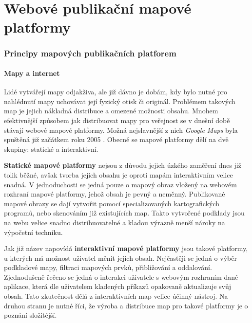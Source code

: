 \newpage

\part{Webové publikační mapové platformy}
\newpage
\section{Principy mapových publikačních platforem}

\subsection{Mapy a internet}

Lidé vytvářejí mapy odjakživa, ale již dávno je dobám, kdy bylo nutné
pro nahlédnutí mapy uchovávat její fyzický otisk či originál. Problémem
takových map je jejich nákladná distribuce a omezené možnosti
obsahu. Mnohem efektivnější způsobem jak distribuovat mapy pro
veřejnost se v dnešní době stávají webové mapové platformy. Možná
nejslavnější z nich \textit{Google Maps} byla spuštěná již začátkem
roku 2005 \cite{google_history}.  Obecně se mapové platformy dělí na
dvě skupiny: statické a interaktivní.

\textbf{Statické mapové platformy} nejsou z důvodu jejich úzkého
zaměření dnes již tolik běžné, avšak tvorba jejich obsahu je oproti
mapám interaktivním velice snadná. V jednoduchosti se jedná pouze o mapový obraz vložený na webovém rozhraní mapové platformy, jehož obsah je pevný a neměnný. Publikované mapové obrazy se dají vytvořit
pomocí specializovaných kartografických programů, nebo skenováním
již existujících map. Takto vytvořené podklady jsou na webu velice
snadno distribuovatelné a kladou výrazně menší nároky na výpočetní
techniku.

Jak již název napovídá \textbf{interaktivní mapové platformy} jsou
takové platformy, u kterých má možnost uživatel měnit jejich
obsah. Nejčastěji se jedná o výběr podkladové mapy, filtraci mapových
prvků, přibližování a oddalování. Zjednodušeně řečeno se jedná o
interakci uživatele s webovým rozhraním dané aplikace, která dle
uživatelem kladených příkazů opakovaně aktualizuje svůj
obsah\cite{web_mapping}. Tato zkutečnost dělá z interaktivních map
velice účinný nástroj. Na druhou stranu je nutné říci, že výroba a
distribuce map pro takové platformy je o poznání složitější.

